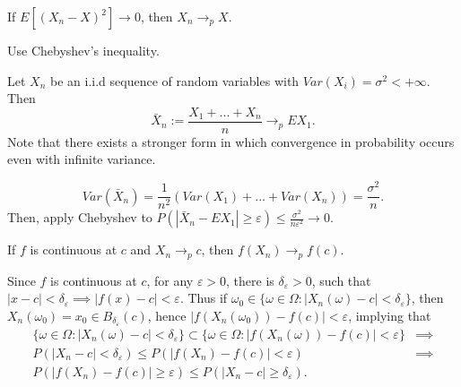 \begin{proposition}
	If $E[(X_n - X)^2] \to 0$, then $X_n \to_p X$.
\end{proposition}
\begin{prf}
	Use Chebyshev's inequality.
\end{prf}

\begin{theorem}
	Let $X_n$ be an i.i.d sequence of random variables with $Var(X_i)=\sigma^2 < +\infty$.
	Then
	\begin{equation}
		\bar X_n := \frac{X_1+...+X_n}{n} \to_p EX_1.
	\end{equation}
	Note that there exists a stronger form in which convergence in probability occurs even
	with infinite variance.
\end{theorem}
\begin{prf}
	\begin{equation*}
		Var(\bar X_n) = \frac{1}{n^2}(Var(X_1)+...+Var(X_n)) = \frac{\sigma^2}{n}.
	\end{equation*}
	Then, apply Chebyshev to $P(|\bar X_n - EX_1|\geq \varepsilon)\leq \frac{\sigma^2}{n \varepsilon^2} \to 0$.
\end{prf}

\begin{proposition}
	If $f$ is continuous at $c$ and $X_n \to_p c$, then $f(X_n) \to_p f(c)$.
\end{proposition}
\begin{prf}
	Since $f$ is continuous at $c$, for any $\varepsilon > 0$, there is $\delta_\varepsilon>0$, such that
	$|x - c| < \delta_\varepsilon \implies |f(x) - c| < \varepsilon$. Thus
	if $\omega_0 \in \{\omega \in \Omega : |X_n(\omega) - c| < \delta_\varepsilon\}$, then
	$X_n(\omega_0) = x_0 \in B_{\delta_\varepsilon}(c)$, hence $|f(X_n(\omega_0))-f(c)| < \varepsilon$,
	implying that
	\begin{align*}
		\{\omega \in \Omega : |X_n(\omega) - c| < \delta_\varepsilon\}
		\subset \{\omega \in \Omega : |f(X_n(\omega)) - f(c)|<\varepsilon\} & \implies \\
		P(|X_n - c|<\delta_\varepsilon)\leq P(|f(X_n) -f(c)|<\varepsilon)   & \implies \\
		P(|f(X_n) - f(c)|\geq\varepsilon)\leq P(|X_n -c|\geq\delta_\varepsilon).
	\end{align*}
\end{prf}


